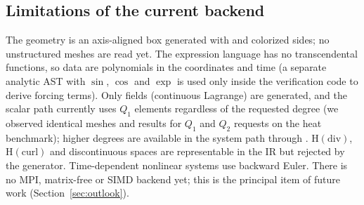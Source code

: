 \subsection{Limitations of the current backend}
The geometry is an axis-aligned box generated with  and colorized sides; no unstructured meshes are read yet. The expression language has no transcendental functions, so data are polynomials in the coordinates and time (a separate analytic AST with $\sin$, $\cos$ and $\exp$ is used only inside the verification code to derive forcing terms). Only  fields (continuous Lagrange) are generated, and the scalar path currently uses $Q_1$ elements regardless of the requested degree (we observed identical meshes and results for $Q_1$ and $Q_2$ requests on the heat benchmark); higher degrees are available in the system path through . $\mathrm{H(div)}$, $\mathrm{H(curl)}$ and discontinuous spaces are representable in the IR but rejected by the generator. Time-dependent nonlinear systems use backward Euler. There is no MPI, matrix-free or SIMD backend yet; this is the principal item of future work (Section~\ref{sec:outlook}).
